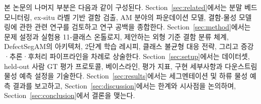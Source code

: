 본 논문의 나머지 부분은 다음과 같이 구성된다. Section~\ref{sec:related}에서는
분말 베드 모니터링, ex-situ 라벨 기반 결함 검출, AM 분야의 파운데이션 모델,
결함-물성 모델링에 관한 관련 연구를 검토하고 연구 공백을 종합한다.
Section~\ref{sec:method}에서는 문제 설정과 실험용 11-클래스 온톨로지,
제안하는 외형 기준 결함 분류 체계, DefectSegAM의 아키텍처, 2단계 학습
레시피, 클래스 불균형 대응 전략, 그리고 증강·추론·후처리 파이프라인을
차례로 상술한다. Section~\ref{sec:setup}에서는 데이터셋, held-out 사람 GT
평가 프로토콜, 베이스라인, 평가 지표, 구현 세부사항과 다운스트림 물성
예측 설정을 기술한다. Section~\ref{sec:results}에서는 세그멘테이션 및 하류
물성 예측 결과를 보고하고, Section~\ref{sec:discussion}에서는 한계와 시사점을
논의하며, Section~\ref{sec:conclusion}에서 결론을 맺는다.
